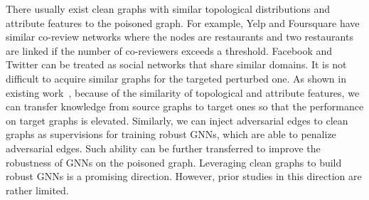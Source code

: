 \documentclass[sigconf]{acmart}
\begin{document}
There usually exist clean graphs with similar topological distributions and attribute features to the poisoned graph.
For example, Yelp and Foursquare have similar co-review networks where the nodes are restaurants and two restaurants are linked if the number of co-reviewers exceeds a threshold. 
Facebook and Twitter can be treated as social networks that share similar domains. It is not difficult to acquire similar graphs for the targeted perturbed one. As shown in existing work~\cite{shu2018crossfire,lee2017transfer}, because of the similarity of topological and attribute features, we can transfer knowledge from source graphs to target ones so that the performance on target graphs is elevated.
Similarly, we can inject adversarial edges to clean graphs as supervisions for training robust GNNs, which are able to penalize adversarial edges. Such ability can be further transferred to improve the robustness of GNNs on the poisoned graph. 
Leveraging clean graphs to build robust GNNs is a promising direction. However, prior studies in this direction are rather limited.
\end{document}
